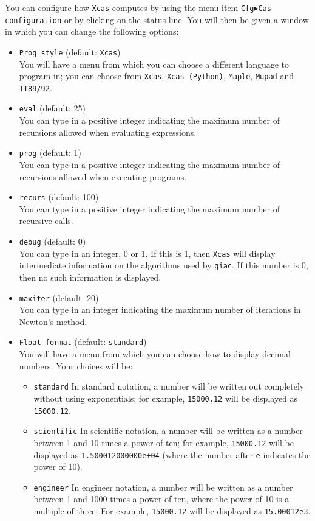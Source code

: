 \documentclass[a4paper,11pt]{book}
\begin{document}
You can configure how \texttt{Xcas} computes by using the menu item 
\texttt{Cfg$\blacktriangleright$Cas configuration} or by clicking on
the status line.  You will then be given a window in which you can
change the following options:
\begin{itemize}
  \item \texttt{Prog style} (default: \texttt{Xcas})\\
  You will have a menu from which you can choose a different language
  to program in; you can choose from \texttt{Xcas}, \texttt{Xcas
  (Python)}, \texttt{Maple}, \texttt{Mupad} and \texttt{TI89/92}.
  
  \item \texttt{eval} (default: 25)\\
  You can type in a positive integer indicating the maximum number of
  recursions allowed when evaluating expressions.
  
  \item \texttt{prog} (default: 1)\\
  You can type in a positive integer indicating the maximum number of
  recursions allowed when executing programs.
  
  \item \texttt{recurs} (default: 100)\\
  You can type in a positive integer indicating the maximum number of
  recursive calls.
  
  \item \texttt{debug} (default: 0)\\
  You can type in an integer, 0 or 1.  If this is 1, then
  \texttt{Xcas} will display intermediate information on the
  algorithms used by \texttt{giac}.  If this number is 0, then no such
  information is displayed. 
  
  \item \texttt{maxiter}  (default: 20)\\
  You can type in an integer indicating the maximum number of
  iterations in Newton's method.
  
  \item \texttt{Float format}  (default: \texttt{standard})\\
  You will have a menu from which you can choose how to display
  decimal numbers.  Your choices will be:
  \begin{itemize}
  \item \texttt{standard}  In standard notation, a number will be
  written out completely without using exponentials; for example,
  \texttt{15000.12} will be displayed as \texttt{15000.12}.
  \item \texttt{scientific}  In scientific notation, a number will be
  written as a number between 1 and 10 times a power of ten; for example,
  \texttt{15000.12} will be displayed as \texttt{1.500012000000e+04}
  (where the number after \texttt{e} indicates the power of 10).
  \item \texttt{engineer}  In engineer notation, a number will be
  written as a number between 1 and 1000 times a power of ten, where
  the power of 10 is a multiple of three.  For example,
  \texttt{15000.12} will be displayed as \texttt{15.00012e3}.
  \end{itemize}


\end{itemize}
\end{document}
